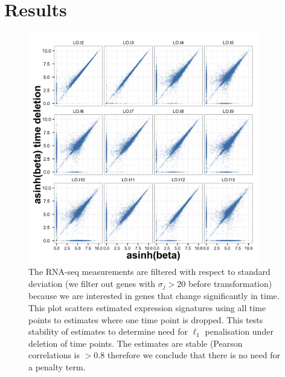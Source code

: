 \section{Results}
\label{sec:results-mcf10a}

\begin{figure}
  \centering
  \includegraphics[width=0.9\textwidth]{pics/no-pen-data.png}
  \caption{The RNA-seq measurements are filtered with respect to standard deviation (we filter out genes with $\sigma_j > 20$ before transformation) because we are interested in genes that change significantly in time. This plot scatters estimated expression signatures using all time points to estimates where one time point is dropped. This tests stability of estimates to determine need for $\ell_1$ penalisation under deletion of time points. The estimates are stable (Pearson correlations is $>0.8$ therefore we conclude that there is no need for a penalty term.}
  \label{fig:data-pen}
\end{figure}

